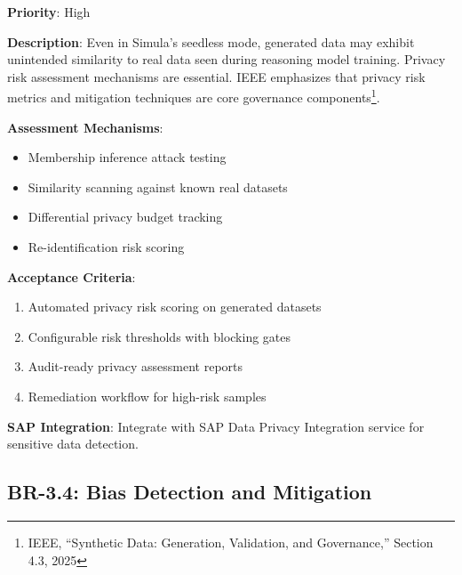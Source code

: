 \begin{tcolorbox}[colback=yellow!5,colframe=yellow!70,title=BR-3.3: Privacy Risk Evaluation]
\textbf{Priority}: High

\textbf{Description}: Even in Simula's seedless mode, generated data may exhibit
unintended similarity to real data seen during reasoning model training. Privacy
risk assessment mechanisms are essential. IEEE emphasizes that privacy risk
metrics and mitigation techniques are core governance components\footnote{IEEE,
``Synthetic Data: Generation, Validation, and Governance,'' Section 4.3, 2025}.

\textbf{Assessment Mechanisms}:
\begin{itemize}
  \item Membership inference attack testing
  \item Similarity scanning against known real datasets
  \item Differential privacy budget tracking
  \item Re-identification risk scoring
\end{itemize}

\textbf{Acceptance Criteria}:
\begin{enumerate}
  \item Automated privacy risk scoring on generated datasets
  \item Configurable risk thresholds with blocking gates
  \item Audit-ready privacy assessment reports
  \item Remediation workflow for high-risk samples
\end{enumerate}

\textbf{SAP Integration}: Integrate with SAP Data Privacy Integration service
for sensitive data detection.
\end{tcolorbox}

\subsection{BR-3.4: Bias Detection and Mitigation}

